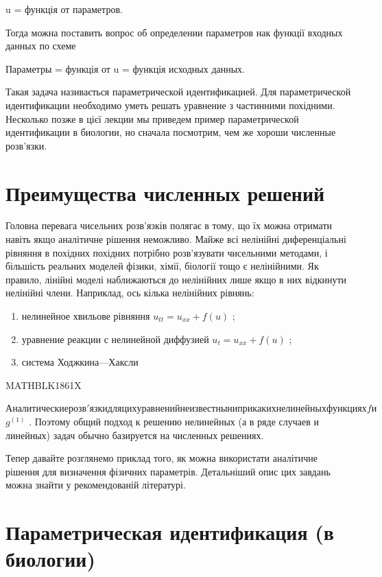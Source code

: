 \documentclass[
  ukrainian,
]{article}
\begin{document}
u = функція от параметров.

Тогда можна поставить вопрос об определении параметров нак функції
входных данных по схеме

Параметры = функція от u = функція исходных данных.

Такая задача називається параметрической идентификацией. Для
параметрической идентификации необходимо уметь решать уравнение з
частинними похідними. Несколько позже в цієї лекции мы приведем пример
параметрической идентификации в биологии, но сначала посмотрим, чем же
хороши численные розв'язки.

\section{Преимущества численных
решений}\label{ux43fux440ux435ux438ux43cux443ux449ux435ux441ux442ux432ux430-ux447ux438ux441ux43bux435ux43dux43dux44bux445-ux440ux435ux448ux435ux43dux438ux439}

Головна перевага чисельних розв'язків полягає в тому, що їх можна
отримати навіть якщо аналітичне рішення неможливо. Майже всі нелінійні
диференціальні рівняння в похідних похідних потрібно розв'язувати
чисельними методами, і більшість реальних моделей фізики, хімії,
біології тощо є нелінійними. Як правило, лінійні моделі наближаються до
нелінійних лише якщо в них відкинути нелінійні члени. Наприклад, ось
кілька нелінійних рівнянь:

\begin{enumerate}
\def\labelenumi{\arabic{enumi})}
\item
  нелинейное хвильове рівняння \(u_{tt} = u_{xx} + f(u)\) ;
\item
  уравнение реакции с нелинейной диффузией \(u_t = u_{xx} + f(u)\) ;
\item
  система Ходжкина---Хаксли
\end{enumerate}

MATHBLK1861X

\(Аналитические розв'язки для цих уравнений не известны ни при каких нелинейных функциях f и\)
\(g^{(1)}\) . Поэтому общий подход к решению нелинейных (а в ряде
случаев и линейных) задач обычно базируется на численных решениях.

Тепер давайте розглянемо приклад того, як можна використати аналітичне
рішення для визначення фізичних параметрів. Детальніший опис цих завдань
можна знайти у рекомендованій літературі.

\section{Параметрическая идентификация (в
биологии)}\label{ux43fux430ux440ux430ux43cux435ux442ux440ux438ux447ux435ux441ux43aux430ux44f-ux438ux434ux435ux43dux442ux438ux444ux438ux43aux430ux446ux438ux44f-ux432-ux431ux438ux43eux43bux43eux433ux438ux438}
\end{document}
